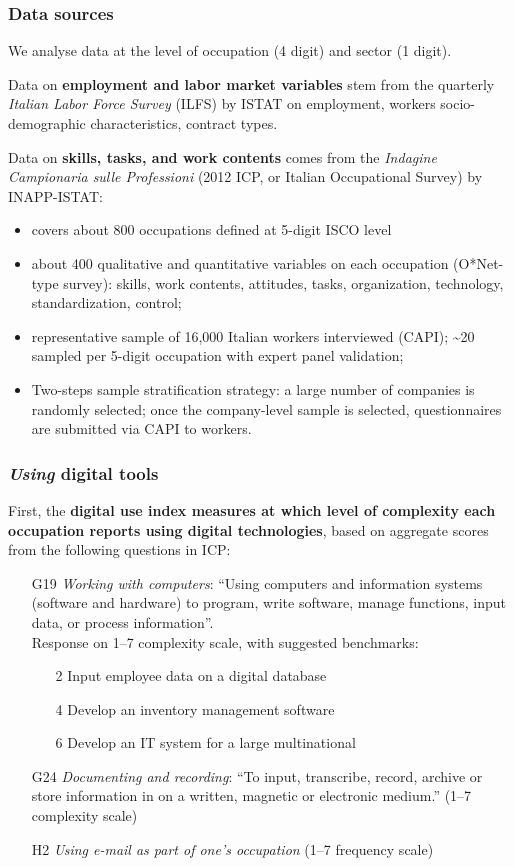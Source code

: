 \documentclass[10pt,xcolor={usenames,dvipsnames}]{beamer}
\begin{document}
\begin{frame} 
\frametitle{Data sources}

We analyse data at the level of occupation (4 digit) and sector (1 digit).
\medskip

Data on \textbf{employment and labor market variables} stem from the quarterly \textit{Italian Labor Force Survey} (ILFS) by ISTAT on  employment, workers socio-demographic characteristics, contract types.
\medskip

Data on \textbf{skills, tasks, and work contents} comes from the \textit{Indagine Campionaria sulle Professioni} (2012 ICP, or Italian Occupational Survey) by INAPP-ISTAT:
\begin{itemize}
    \item covers about 800 occupations defined at 5-digit ISCO level
    \item about 400 qualitative and quantitative variables on each occupation (O*Net-type survey): skills, work contents, attitudes, tasks, organization, technology, standardization, control;
    \item representative sample of 16,000 Italian workers interviewed (CAPI); \textasciitilde20 sampled per 5-digit occupation with expert panel validation;
    \item Two-steps sample stratification strategy: a large number of companies is randomly selected; once the company-level sample is selected, questionnaires are submitted via CAPI to workers.
\end{itemize}
\end{frame}

\begin{frame}
\frametitle{\textit{Using} digital tools}


First, the \textbf{digital use index measures at which level of complexity each occupation reports using digital technologies}, based on aggregate scores from the following questions in ICP:
\begin{itemize}
\item[G19] \textit{Working with computers}: “Using computers and information systems (software and hardware) to program, write software, manage functions, input data, or process information”.\\
Response on 1--7 complexity scale, with suggested benchmarks:
\begin{itemize}
    \item[2] Input employee data on a digital database
    \item[4] Develop an inventory management software
    \item[6] Develop an IT system for a large multinational
\end{itemize}
\item[G24] \textit{Documenting and recording}: “To input, transcribe, record, archive or store information in on a written, magnetic or electronic medium.” (1--7 complexity scale)
\item[H2] \textit{Using e-mail as part of one’s occupation} (1--7 frequency scale)
\end{itemize}
\end{frame}
\end{document}
